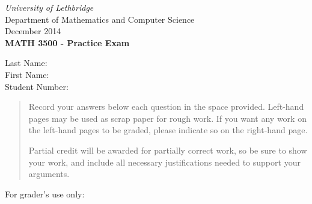 \documentclass[12pt]{article}
\newcommand{\skipline}{\vspace{12pt}}
\begin{document}
\author{Instructor: Sean Fitzpatrick}
\thispagestyle{plain}
\begin{center}
\emph{University of Lethbridge}\\
Department of Mathematics and Computer Science\\
December 2014\\
{\bf MATH 3500 - Practice Exam}\\
\end{center}
\skipline \skipline \skipline \noindent \skipline
Last Name:\underline{\hspace{350pt}}\\
\skipline
First Name:\underline{\hspace{348pt}}\\
\skipline
Student Number:\underline{\hspace{322pt}}\\
\skipline

\vspace{0.5in}


\begin{quote}

 
 {Record your answers below each question in the space provided.    Left-hand pages may be used as scrap paper for rough work.  If you want any work on the left-hand pages to be graded, please indicate so on the right-hand page.
 
 \bigskip
 
Partial credit will be awarded for partially correct work, so be sure to show your work, and include all necessary justifications needed to support your arguments. }

\end{quote}


\vspace{0.5in}

For grader's use only:
\end{document}
